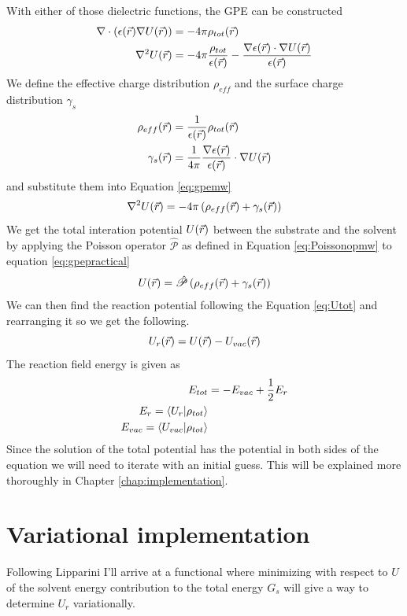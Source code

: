 \documentclass[../master_thesis.tex]{subfiles}
\begin{document}
With either of those dielectric functions, the \ac{GPE} can be constructed
\cite{Sorland, FossoTande:2013ka}
\begin{align}\label{eq:gpemw}
  \nabla\cdot (\epsilon(\vec{r})\nabla U(\vec{r})) &= -4\pi \rho_{tot}(\vec{r}) \\
  \nabla^2U(\vec{r}) &= -4\pi \frac{\rho_{tot}}{\epsilon(\vec{r})} - \frac{\nabla
  \epsilon(\vec{r})\cdot \nabla U(\vec{r})}{\epsilon(\vec{r})}
\end{align}
We define the effective charge distribution $\rho_{eff}$ and the surface charge
distribution $\gamma_s$ \cite{FossoTande:2013ka}
\begin{align}\label{eq:effrhogamma}
  \rho_{eff}(\vec{r}) &= \frac{1}{\epsilon(\vec{r})}\rho_{tot}(\vec{r}) \\
  \gamma_s(\vec{r}) &= \frac{1}{4\pi}\frac{\nabla\epsilon(\vec{r})}{\epsilon(\vec{r})}\cdot\nabla U(\vec{r})
\end{align}
and substitute them into Equation \ref{eq:gpemw}
\begin{equation}\label{eq:gpepractical}
  \nabla^2U(\vec{r}) = -4\pi\left( \rho_{eff}(\vec{r}) + \gamma_s(\vec{r})\right)
\end{equation}
We get the total interation potential $U(\vec{r})$ between the substrate and the solvent by
applying the Poisson operator $\hat{\mathscr{P}}$ as defined in Equation
\ref{eq:Poissonopmw} to equation \ref{eq:gpepractical}
\begin{equation}
  U(\vec{r}) = \hat{\mathscr{P}}\left( \rho_{eff}(\vec{r}) + \gamma_s(\vec{r})\right)
\end{equation}
We can then find the reaction potential following the Equation \ref{eq:Utot} and
rearranging it so we get the following.
\begin{equation}
  U_r(\vec{r}) = U(\vec{r}) - U_{vac}(\vec{r})
\end{equation}
The reaction field energy is given as \cite{FossoTande:2013ka}
\begin{align}
  E_{tot} &= - E_{vac} + \frac{1}{2}E_r \\
  E_r = \braket{U_r | \rho_{tot}}\\
  E_{vac} = \braket{U_{vac}| \rho_{tot}}
\end{align}
Since the solution of the total potential has the potential in both sides of the
equation we will need to iterate with an initial guess. This will be explained
more thoroughly in Chapter \ref{chap:implementation}.

\section{Variational implementation}
Following Lipparini \cite{Lipparini:2010bg, Lipparini:2013} I'll arrive at a functional where
minimizing with respect to $U$ of the solvent energy contribution to
the total energy $G_s$ will give a way to determine $U_r$ variationally.
\end{document}
